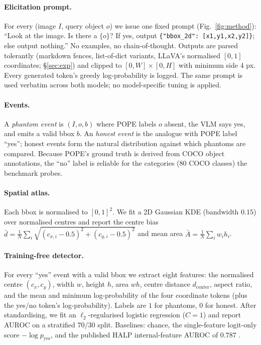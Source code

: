 \documentclass[10pt,twocolumn,letterpaper]{article}
\begin{document}
\paragraph{Elicitation prompt.} For every (image $I$, query object
$o$) we issue one fixed prompt (Fig.~\ref{fig:method}):
``Look at the image. Is there a $\{o\}$? If yes, output
\texttt{\{"bbox\_2d": [x1,y1,x2,y2]\}}; else output nothing.'' No
examples, no chain-of-thought. Outputs are parsed tolerantly
(markdown fences, list-of-dict variants, LLaVA's normalised $[0,1]$
coordinates; \S\ref{sec:exp}) and clipped to $[0,W]\times[0,H]$ with
minimum side $4$ px. Every generated token's greedy log-probability is
logged. The same prompt is used verbatim across both models; no
model-specific tuning is applied.

\paragraph{Events.} A \emph{phantom event} is $(I, o, b)$ where POPE
labels $o$ absent, the VLM says yes, and emits a valid bbox $b$. An
\emph{honest event} is the analogue with POPE label ``yes''; honest
events form the natural distribution against which phantoms are
compared. Because POPE's ground truth is derived from COCO object
annotations, the ``no'' label is reliable for the categories
(80 COCO classes) the benchmark probes.

\paragraph{Spatial atlas.} \label{sec:atlas}
Each bbox is normalised to $[0,1]^2$. We fit a 2D Gaussian KDE
(bandwidth $0.15$) over normalised centres and report the
centre bias
$\bar{d} = \tfrac{1}{N}\sum_i \sqrt{(c_{x,i}-0.5)^2 + (c_{y,i}-0.5)^2}$
and mean area $\bar{A} = \tfrac{1}{N}\sum_i w_i h_i$.

\paragraph{Training-free detector.} \label{sec:detector}
For every ``yes'' event with a valid bbox we extract eight features:
the normalised centre $(c_x, c_y)$, width $w$, height $h$, area $wh$,
centre distance $d_\text{center}$, aspect ratio, and the mean and
minimum log-probability of the four coordinate tokens (plus the yes/no
token's log-probability). Labels are $1$ for phantoms, $0$ for honest.
After standardising, we fit an $\ell_2$-regularised logistic regression
($C{=}1$) and report AUROC on a stratified $70/30$ split. Baselines:
chance, the single-feature logit-only score $-\log p_\text{yes}$, and
the published HALP internal-feature AUROC of $0.787$ \cite{halp}.
\end{document}
